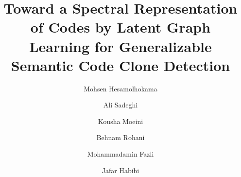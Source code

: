 \documentclass[authoryear,final,5p,times,twocolumn]{elsarticle}
\theoremstyle{plain}
\begin{document}
\begin{frontmatter}



\title{Toward a Spectral Representation of Codes by Latent Graph Learning for Generalizable Semantic Code Clone Detection}


\author[mce]{Mohsen Hesamolhokama}

\author[math]{Ali Sadeghi}

\author[math]{Kousha Moeini}

\author[math]{Behnam Rohani}

\author[mce]{Mohammadamin Fazli}

\author[mce]{Jafar Habibi}

\address[mce]{Department of Computer Engineering, Sharif University of Technology, Tehran, Iran}
\address[math]{Department of Mathematical Sciences, Sharif University of Technology, Tehran, Iran}



\end{frontmatter}
\end{document}

